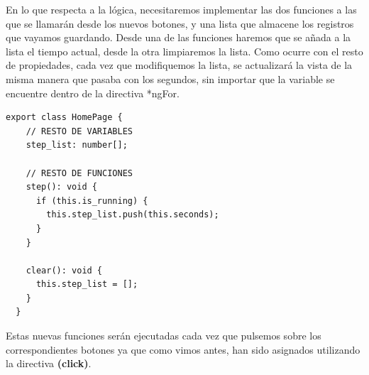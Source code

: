 En lo que respecta a la lógica, necesitaremos implementar las dos funciones a las que se llamarán desde los nuevos botones, y una lista que almacene los registros que vayamos guardando. Desde una de las funciones haremos que se añada a la lista el tiempo actual, desde la otra limpiaremos la lista. Como ocurre con el resto de propiedades, cada vez que modifiquemos la lista, se actualizará la vista de la misma manera que pasaba con los segundos, sin importar que la variable se encuentre dentro de la directiva *ngFor.

\begin{lstlisting}[style=htmlcssjs,frame=tlrb,xleftmargin={0.2cm}]
  export class HomePage {
    // RESTO DE VARIABLES
    step_list: number[];

    // RESTO DE FUNCIONES
    step(): void {
      if (this.is_running) {
        this.step_list.push(this.seconds);
      }
    }

    clear(): void {
      this.step_list = [];
    }
  }
\end{lstlisting}

Estas nuevas funciones serán ejecutadas cada vez que pulsemos sobre los correspondientes botones ya que como vimos antes, han sido asignados utilizando la directiva \textbf{(click)}.
